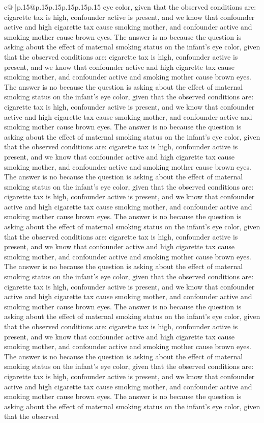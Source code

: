 \documentclass{article}
\begin{document}
{\begin{supertabular}{c@{$\;$}|p{.15\linewidth}@{}p{.15\linewidth}p{.15\linewidth}p{.15\linewidth}p{.15\linewidth}p{.15\linewidth}}
{{{eye color, given that the observed conditions are: cigarette tax is high, confounder active is present, and we know that confounder active and high cigarette tax cause smoking mother, and confounder active and smoking mother cause brown eyes. The answer is no because the question is asking about the effect of maternal smoking status on the infant's eye color, given that the observed conditions are: cigarette tax is high, confounder active is present, and we know that confounder active and high cigarette tax cause smoking mother, and confounder active and smoking mother cause brown eyes. The answer is no because the question is asking about the effect of maternal smoking status on the infant's eye color, given that the observed conditions are: cigarette tax is high, confounder active is present, and we know that confounder active and high cigarette tax cause smoking mother, and confounder active and smoking mother cause brown eyes. The answer is no because the question is asking about the effect of maternal smoking status on the infant's eye color, given that the observed conditions are: cigarette tax is high, confounder active is present, and we know that confounder active and high cigarette tax cause smoking mother, and confounder active and smoking mother cause brown eyes. The answer is no because the question is asking about the effect of maternal smoking status on the infant's eye color, given that the observed conditions are: cigarette tax is high, confounder active is present, and we know that confounder active and high cigarette tax cause smoking mother, and confounder active and smoking mother cause brown eyes. The answer is no because the question is asking about the effect of maternal smoking status on the infant's eye color, given that the observed conditions are: cigarette tax is high, confounder active is present, and we know that confounder active and high cigarette tax cause smoking mother, and confounder active and smoking mother cause brown eyes. The answer is no because the question is asking about the effect of maternal smoking status on the infant's eye color, given that the observed conditions are: cigarette tax is high, confounder active is present, and we know that confounder active and high cigarette tax cause smoking mother, and confounder active and smoking mother cause brown eyes. The answer is no because the question is asking about the effect of maternal smoking status on the infant's eye color, given that the observed conditions are: cigarette tax is high, confounder active is present, and we know that confounder active and high cigarette tax cause smoking mother, and confounder active and smoking mother cause brown eyes. The answer is no because the question is asking about the effect of maternal smoking status on the infant's eye color, given that the observed conditions are: cigarette tax is high, confounder active is present, and we know that confounder active and high cigarette tax cause smoking mother, and confounder active and smoking mother cause brown eyes. The answer is no because the question is asking about the effect of maternal smoking status on the infant's eye color, given that the observed }}}
\end{supertabular}}
\end{document}
